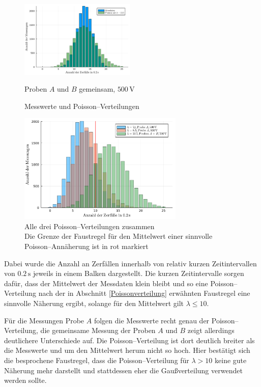 \documentclass[12pt,a4paper]{scrartcl}
\numberwithin{equation}{section} %
\renewcommand{\[}{} %
\renewcommand{\]}{\noindent} %
\begin{document}
\begin{figure}
	\includegraphics[width=0.49\textwidth]{../media/B3.1/poisson3.pdf}
	\caption*{Proben $A$ und $B$ gemeinsam, $500 \mathrm{\, V}$}
	\vspace{3pt}
	
	\caption{Messwerte und Poisson--Verteilungen}
	\label{fig:poisson single}
	\vspace{12pt}
	
	\includegraphics[width=0.7\textwidth]{../media/B3.1/allePoisson.pdf}
	\caption{Alle drei Poisson--Verteilungen zusammen\\
		Die Grenze der Faustregel für den Mittelwert einer sinnvolle Poisson--Annäherung ist in rot markiert}
	\label{fig:allePoisson}	
\end{figure}

\noindent
Dabei wurde die Anzahl an Zerfällen innerhalb von relativ kurzen Zeitintervallen von $0.2 \mathrm{\,s}$ jeweils in einem Balken dargestellt. Die kurzen Zeitintervalle sorgen dafür, dass der Mittelwert der Messdaten klein bleibt und so eine Poisson--Verteilung nach der in Abschnitt \ref{Poissonverteilung} erwähnten Faustregel eine sinnvolle Näherung ergibt, solange für den Mittelwert gilt $\lambda \leq 10$.

Für die Messungen  Probe $A$ folgen die Messwerte recht genau der Poisson--Verteilung, die gemeinsame Messung der Proben $A$ und $B$ zeigt allerdings deutlichere Unterschiede auf. Die Poisson--Verteilung ist dort deutlich breiter als die Messwerte und um den Mittelwert herum nicht so hoch. Hier bestätigt sich die besprochene Faustregel, dass die Poisson--Verteilung für $\lambda > 10$ keine gute Näherung mehr darstellt und stattdessen eher die Gaußverteilung verwendet werden sollte.
\end{document}
